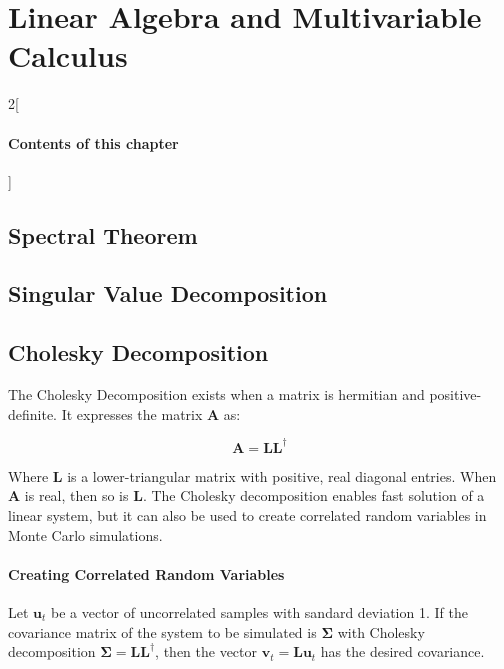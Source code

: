 \chapter{Linear Algebra and Multivariable Calculus}

\begin{multicols}{2}[\subsubsection*{Contents of this chapter}]
\end{multicols}

\section{Spectral Theorem}

\section{Singular Value Decomposition}




\section{Cholesky Decomposition}
\label{sec:cholesky}

The Cholesky Decomposition exists when a matrix is hermitian and positive-definite. It expresses the matrix $\mathbf{A}$ as:

\begin{equation}
\mathbf{A} = \mathbf{L}\mathbf{L^\dagger}
\end{equation}

Where $\mathbf{L}$ is a lower-triangular matrix with positive, real diagonal entries. When $\mathbf{A}$ is real, then so is $\mathbf{L}$. The Cholesky decomposition enables fast solution of a linear system, but it can also be used to create correlated random variables in Monte Carlo simulations. 

\subsubsection{Creating Correlated Random Variables}
Let $\mathbf{u}_t$ be a vector of uncorrelated samples with sandard deviation 1. If the covariance matrix of the system to be simulated is  $\mathbf{\Sigma}$ with Cholesky decomposition $\mathbf{\Sigma} = \mathbf{LL}^\dagger$, then the vector $\mathbf{v}_t = \mathbf{Lu}_t$ has the desired covariance.

